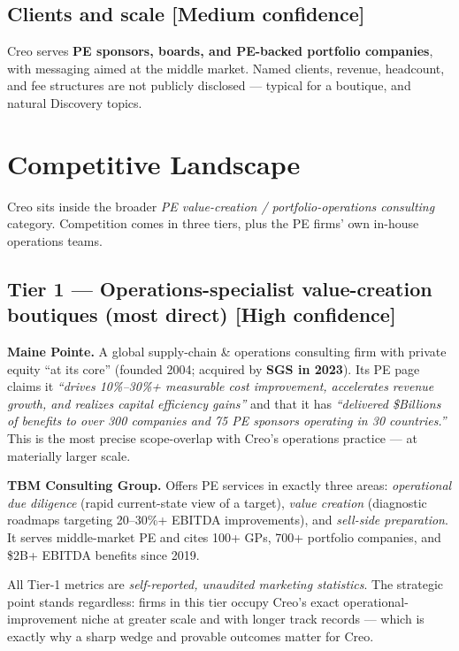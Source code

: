 \documentclass[11pt]{article}
\newcommand{\high}{\textcolor{green!45!black}{\textbf{[High confidence]}}}
\newcommand{\medium}{\textcolor{orange!80!black}{\textbf{[Medium confidence]}}}
\begin{document}
\subsection{Clients and scale \medium}
Creo serves \textbf{PE sponsors, boards, and PE-backed portfolio companies},
with messaging aimed at the middle market. Named clients, revenue, headcount,
and fee structures are not publicly disclosed --- typical for a boutique, and
natural Discovery topics.

\section{Competitive Landscape}

Creo sits inside the broader \emph{PE value-creation / portfolio-operations
consulting} category. Competition comes in three tiers, plus the PE firms' own
in-house operations teams.

\subsection{Tier 1 --- Operations-specialist value-creation boutiques (most direct) \high}

\textbf{Maine Pointe.} A global supply-chain \& operations consulting firm with
private equity ``at its core'' (founded 2004; acquired by \textbf{SGS in 2023}).
Its PE page claims it \emph{``drives 10\%--30\%+ measurable cost improvement,
accelerates revenue growth, and realizes capital efficiency gains''} and that it
has \emph{``delivered \$Billions of benefits to over 300 companies and 75 PE
sponsors operating in 30 countries.''} This is the most precise scope-overlap
with Creo's operations practice --- at materially larger scale.

\textbf{TBM Consulting Group.} Offers PE services in exactly three areas:
\emph{operational due diligence} (rapid current-state view of a target),
\emph{value creation} (diagnostic roadmaps targeting 20--30\%+ EBITDA
improvements), and \emph{sell-side preparation}. It serves middle-market PE and
cites 100+ GPs, 700+ portfolio companies, and \$2B+ EBITDA benefits since 2019.

\begin{takeaway}
All Tier-1 metrics are \emph{self-reported, unaudited marketing statistics}.
The strategic point stands regardless: firms in this tier occupy Creo's exact
operational-improvement niche at greater scale and with longer track records ---
which is exactly why a sharp wedge and provable outcomes matter for Creo.
\end{takeaway}
\end{document}
